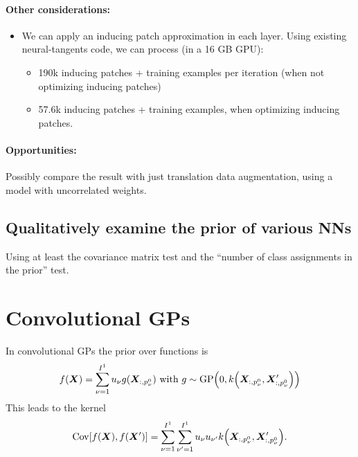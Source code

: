 \documentclass{article} %
\newcommand{\bracket}[3]{{\left#1 #3 \right#2}}
\newcommand{\bra}{\bracket{(}{)}}
\newcommand{\sqb}{\bracket{[}{]}}
\newcommand{\ssup}[1]{^{#1}}
\newcommand{\GP}[1]{{\text{GP}\bra{#1}}}
\begin{document}
\paragraph{Other considerations:}
\begin{itemize}
  \item We can apply an inducing patch approximation in each layer. Using
    existing neural-tangents code, we can process (in a 16 GB GPU):
    \begin{itemize}
      \item 190k inducing patches + training examples per iteration (when not
        optimizing inducing patches)
      \item 57.6k inducing patches + training examples, when optimizing inducing
        patches.
    \end{itemize}
\end{itemize}

\paragraph{Opportunities:}
Possibly compare the result with just translation data augmentation, using a
model with uncorrelated weights.

\subsection{Qualitatively examine the prior of various NNs}
Using at least the covariance matrix test and the ``number of class assignments
in the prior'' test.

\section{Convolutional GPs}

In convolutional GPs \citep{markvdw2017convolutional} the prior over functions is
\begin{equation}
  f(\mX) = \sum_{\nu=1}^{I\ssup{1}} \evu_\nu g(\mX_{:, p\ssup{0}_\nu}) \text{ with } g \sim \GP{0, k\bra{\mX_{:, p\ssup{0}_\nu}, \mX'_{:, p\ssup{0}_\nu}}}
\end{equation}
This leads to the kernel 
\begin{equation}
  \Cov\sqb{f(\mX), f(\mX')} = \sum_{\nu=1}^{I\ssup{1}}\sum_{\nu'=1}^{I\ssup{1}} \evu_{\nu} \evu_{\nu'} k\bra{\mX_{:, p\ssup{0}_\nu}, \mX'_{:, p\ssup{0}_\nu}}.
\end{equation}
\end{document}
